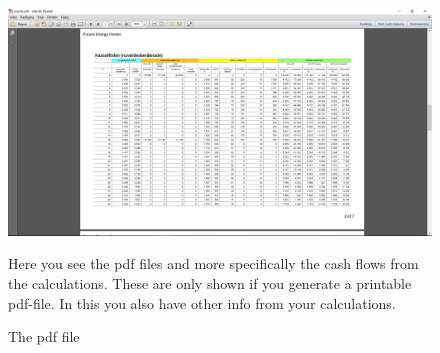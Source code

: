 \documentclass[]{article}
\begin{document}
\begin{figure}[H]
	\includegraphics[width=1.0\linewidth]{pdfresults}
	\caption{The pdf file}
	\medskip
	\small
	Here you see the pdf files and more specifically the cash flows from the calculations. These are only shown if you generate a printable pdf-file. In this you also have other info from your calculations.
	\label{fig:pdfresults}
\end{figure}
\end{document}
